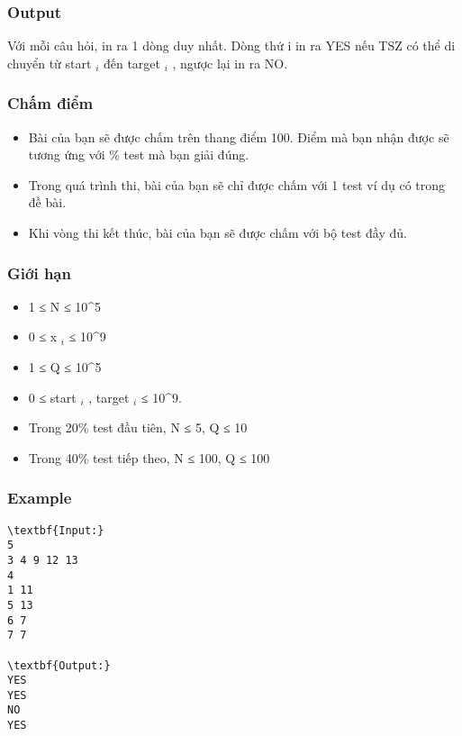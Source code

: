 \subsubsection{Output}

Với mỗi câu hỏi, in ra 1 dòng duy nhất. Dòng thứ i in ra YES nếu TSZ có thể di chuyển từ start $_ i $ đến target $_ i $ , ngược lại in ra NO.

\subsubsection{Chấm điểm}
\begin{itemize}
	\item Bài của bạn sẽ được chấm trên thang điểm 100. Điểm mà bạn nhận được sẽ tương ứng với \% test mà bạn giải đúng.
	\item Trong quá trình thi, bài của bạn sẽ chỉ được chấm với 1 test ví dụ có trong đề bài.
	\item Khi vòng thi kết thúc, bài của bạn sẽ được chấm với bộ test đầy đủ.
\end{itemize}

\subsubsection{Giới hạn}
\begin{itemize}
	\item 1 ≤ N ≤ 10\textasciicircum5
	\item 0 ≤ x $_ i $ ≤ 10\textasciicircum9
	\item 1 ≤ Q ≤ 10\textasciicircum5
	\item 0 ≤ start $_ i $ , target $_ i $ ≤ 10\textasciicircum9.
	\item Trong 20\% test đầu tiên, N ≤ 5, Q ≤ 10
	\item Trong 40\% test tiếp theo, N ≤ 100, Q ≤ 100
\end{itemize}

\subsubsection{Example}
\begin{verbatim}
\textbf{Input:}
5
3 4 9 12 13
4
1 11
5 13
6 7
7 7

\textbf{Output:}
YES
YES
NO
YES
\end{verbatim}